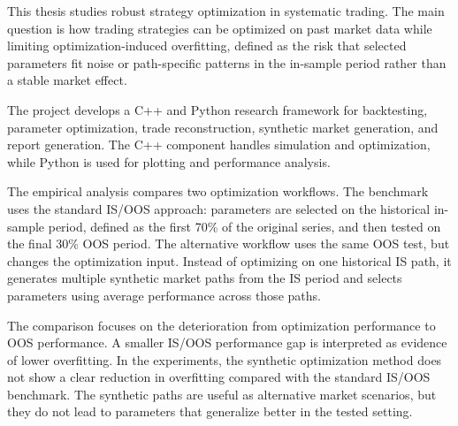 This thesis studies robust strategy optimization in systematic trading. The main question is how
trading strategies can be optimized on past market data while limiting optimization-induced
overfitting, defined as the risk that selected parameters fit noise or path-specific patterns in the
in-sample period rather than a stable market effect.

The project develops a C++ and Python research framework for backtesting, parameter optimization,
trade reconstruction, synthetic market generation, and report generation. The C++ component handles
simulation and optimization, while Python is used for plotting and performance analysis.

The empirical analysis compares two optimization workflows. The benchmark uses the standard IS/OOS
approach: parameters are selected on the historical in-sample period, defined as the first 70\% of the
original series, and then tested on the final 30\% OOS period. The alternative workflow uses the same
OOS test, but changes the optimization input. Instead of optimizing on one historical IS path, it
generates multiple synthetic market paths from the IS period and selects parameters using average
performance across those paths.

The comparison focuses on the deterioration from optimization performance to OOS performance. A
smaller IS/OOS performance gap is interpreted as evidence of lower overfitting. In the experiments,
the synthetic optimization method does not show a clear reduction in overfitting compared with the
standard IS/OOS benchmark. The synthetic paths are useful as alternative market scenarios, but they do
not lead to parameters that generalize better in the tested setting.
